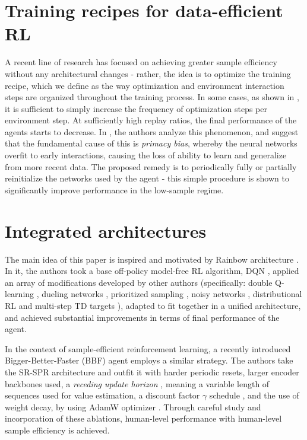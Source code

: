 \documentclass[en]{pracamgr}
\begin{document}
\section{Training recipes for data-efficient RL}

A recent line of research has focused on achieving greater sample efficiency without any architectural changes - rather, the idea is to optimize the training recipe, which we define as the way optimization and environment interaction steps are organized throughout the training process. In some cases, as shown in \autocite{vanhasseltWhenUseParametric2019}, it is sufficient to simply increase the frequency of optimization steps per environment step. At sufficiently high replay ratios, the final performance of the agents starts to decrease. In \autocite{nikishinPrimacyBiasDeep2022}, the authors analyze this phenomenon, and suggest that the fundamental cause of this is \emph{primacy bias}, whereby the neural networks overfit to early interactions, causing the loss of ability to learn and generalize from more recent data. The proposed remedy is to periodically fully or partially reinitialize the networks used by the agent - this simple procedure is shown to significantly improve performance in the low-sample regime.

\section{Integrated architectures}

The main idea of this paper is inspired and motivated by Rainbow architecture \autocite{hesselRainbowCombiningImprovements2017}. In it, the authors took a base off-policy model-free RL algorithm, DQN \autocite{mnihHumanlevelControlDeep2015}, applied an array of modifications developed by other authors (specifically: double Q-learning \autocite{hasseltDeepReinforcementLearning2015}, dueling networks \autocite{wangDuelingNetworkArchitectures2016}, prioritized sampling \autocite{schaulPrioritizedExperienceReplay2016}, noisy networks \autocite{fortunatoNoisyNetworksExploration2019}, distributional RL \autocite{bellemareDistributionalPerspectiveReinforcement2017} and multi-step TD targets \autocite{suttonLearningPredictMethods1988}), adapted to fit together in a unified architecture, and achieved substantial improvements in terms of final performance of the agent.

In the context of sample-efficient reinforcement learning, a recently introduced Bigger-Better-Faster (BBF) \autocite{schwarzerBiggerBetterFaster2023} agent employs a similar strategy. The authors take the SR-SPR architecture \autocite{doroSampleEfficientReinforcementLearning2022} and outfit it with harder periodic resets, larger encoder backbones used, a \emph{receding update horizon} \autocite{kearnsBiasVarianceErrorBounds2000}, meaning a variable length of sequences used for value estimation, a discount factor $\gamma$ schedule \autocite{francois-lavetHowDiscountDeep2016}, and the use of weight decay, by using AdamW optimizer \autocite{loshchilovDecoupledWeightDecay2018}. Through careful study and incorporation of these ablations, human-level performance with human-level sample efficiency is achieved.
\end{document}
